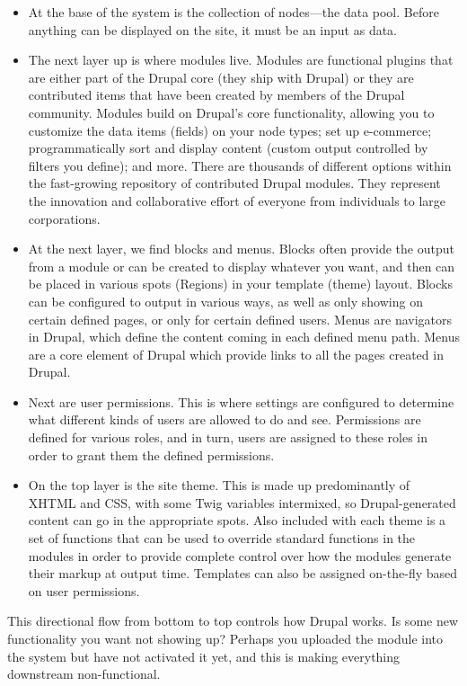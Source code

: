 \begin{itemize}
\item At the base of the system is the collection of nodes—the data pool. Before anything can be displayed on the site, it must be an input as data.
\item The next layer up is where modules live. Modules are functional plugins that are either part of the Drupal core (they ship with Drupal) or they are contributed items that have been created by members of the Drupal community. Modules build on Drupal's core functionality, allowing you to customize the data items (fields) on your node types; set up e-commerce; programmatically sort and display content (custom output controlled by filters you define); and more. There are thousands of different options within the fast-growing repository of contributed Drupal modules. They represent the innovation and collaborative effort of everyone from individuals to large corporations.
\item At the next layer, we find blocks and menus. Blocks often provide the output from a module or can be created to display whatever you want, and then can be placed in various spots (Regions) in your template (theme) layout. Blocks can be configured to output in various ways, as well as only showing on certain defined pages, or only for certain defined users. Menus are navigators in Drupal, which define the content coming in each defined menu path. Menus are a core element of Drupal which provide links to all the pages created in Drupal.
\item Next are user permissions. This is where settings are configured to determine what different kinds of users are allowed to do and see. Permissions are defined for various roles, and in turn, users are assigned to these roles in order to grant them the defined permissions.
\item On the top layer is the site theme. This is made up predominantly of XHTML and CSS, with some Twig variables intermixed, so Drupal-generated content can go in the appropriate spots. Also included with each theme is a set of functions that can be used to override standard functions in the modules in order to provide complete control over how the modules generate their markup at output time. Templates can also be assigned on-the-fly based on user permissions.
\end{itemize}

This directional flow from bottom to top controls how Drupal works. Is some new functionality you want not showing up? Perhaps you uploaded the module into the system but have not activated it yet, and this is making everything downstream non-functional.

